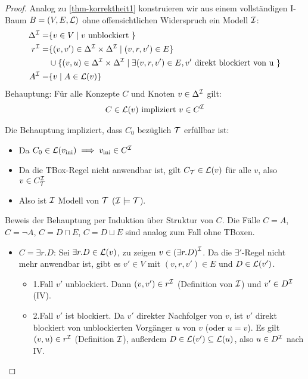 \begin{proof}
    Analog zu \autoref{thm-korrektheit1} konstruieren wir aus einem vollständigen I-Baum $B = (V, E, \mathcal{L})$ ohne offensichtlichen Widerspruch ein Modell $\mathcal{I}$:
    \begin{align*}
        \Delta^{\mathcal{I}} = &\{ v \in V \mid v \text{ unblockiert } \}\\
        r^{\mathcal{I}} = &\{(v, v') \in \Delta^{\mathcal{I}} \times \Delta^{\mathcal{I}} \mid (v, r, v') \in E\}\\
                &\cup \{(v, u) \in \Delta^{\mathcal{I}} \times \Delta^{\mathcal{I}} \mid \exists (v, r, v') \in E, v' \text{ direkt blockiert von u }\}\\
        A^{\mathcal{I}} = & \{ v \mid A \in \mathcal{L}(v)\}
    \end{align*}
    Behauptung: Für alle Konzepte $C$ und Knoten $v \in \Delta^{\mathcal{I}}$ gilt:
    \begin{align*}
        C \in \mathcal{L}(v) \text{ impliziert } v \in C^{\mathcal{I}} 
    \end{align*}
    \begin{tafel}
    Die Behauptung impliziert, dass $C_0$ bezüglich $\mathcal{T}$ erfüllbar ist:
    \begin{itemize}
        \item Da $C_0 \in \mathcal{L}(v_{\text{ini}}) \implies v_{\text{ini}} \in C^{\mathcal{I}}$
        \item Da die TBox-Regel nicht anwendbar ist, gilt $C_{\mathcal{T}} \in \mathcal{L}(v)$ für alle $v$, also $v \in C^{\mathcal{I}}_{\mathcal{T}}$
        \item Also ist $\mathcal{I}$ Modell von $\mathcal{T}$ ($\mathcal{I} \models \mathcal{T}$).
    \end{itemize}
    Beweis der Behauptung per Induktion über Struktur von $C$. Die Fälle $C = A$, $C=\neg A$, $C=D\sqcap E$, $C = D\sqcup E$ sind analog zum Fall ohne TBoxen.
    \begin{itemize}
        \item $C = \exists r.D$:  Sei $\exists r.D \in \mathcal{L}(v)$, zu zeigen $v \in {(\exists r.D)}^{\mathcal{I}}$.
            Da die $\exists'$-Regel nicht mehr anwendbar ist, gibt es $v' \in V$ mit $(v, r, v') \in E$ und $D \in \mathcal{L}(v')$.
            \begin{itemize}
                \item 1.Fall $v'$ unblockiert. Dann  $(v, v') \in r^{\mathcal{I}}$ (Definition von $\mathcal{I}$) und $v' \in D^{\mathcal{I}}$ (IV).
                \item 2.Fall $v'$ ist blockiert. Da $v'$ direkter Nachfolger von $v$, ist $v'$ direkt blockiert von unblockierten Vorgänger $u$ von $v$ (oder $u = v$). Es gilt $(v, u) \in r^{\mathcal{I}}$ (Definition $\mathcal{I}$), außerdem $D \in \mathcal{L}(v') \subseteq \mathcal{L}(u)$, also $u \in D^{\mathcal{I}}$ nach IV.

\end{itemize}
\end{itemize}
\end{tafel}
\end{proof}
